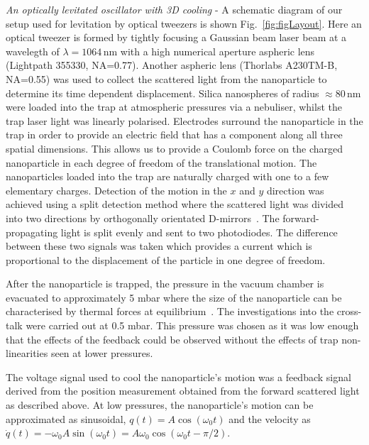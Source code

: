 \documentclass[aps,pra,twocolumn,nopacs,superscriptaddress,groupedaddress]{revtex4}
\begin{document}
\emph{An optically levitated oscillator with 3D cooling} - A schematic diagram of our setup used for levitation by optical tweezers is shown Fig.~\ref{fig:figLayout}.  Here an optical tweezer is formed by tightly focusing a Gaussian beam laser beam at a wavelegth of $\lambda=1064$\,nm with a high numerical aperture aspheric lens (Lightpath 355330, NA=0.77). Another aspheric lens (Thorlabs A230TM-B, NA=0.55) was used to collect the scattered light from the nanoparticle to determine its time dependent displacement. Silica nanospheres of radius $\approx80\,$nm were loaded into the trap at atmospheric pressures via a nebuliser, whilst the trap laser light was linearly polarised. Electrodes surround the nanoparticle in the trap in order to provide an electric field that has a component along all three spatial dimensions. This allows us to provide a Coulomb force on the charged nanoparticle in each degree of freedom of the translational motion. The nanoparticles loaded into the trap are naturally charged with one to a few elementary charges. Detection of the motion in the $x$ and $y$ direction was achieved using a split detection method where the scattered light was divided into two directions by orthogonally orientated D-mirrors~\cite{Li20213D}. The forward-propagating light is split evenly and sent to two photodiodes. The difference between these two signals was taken which provides a current which is proportional  to the displacement of the particle in one degree of freedom.  

After the nanoparticle is trapped, the pressure in the vacuum chamber is evacuated to approximately 5 mbar where the size of the nanoparticle can be characterised by thermal forces at equilibrium~\cite{Hebestreit2018Calibration}. The investigations into the cross-talk were carried out at 0.5 mbar. This pressure was chosen as it was low enough that the effects of the feedback could be observed without the effects of trap non-linearities seen at lower pressures.

The voltage signal used to cool the nanoparticle's motion was a feedback signal derived from the position measurement obtained from the forward scattered light as described above. At low pressures, the nanoparticle's motion can be approximated as sinusoidal, $q(t)=A \cos(\omega_0 t)$ and the velocity as $\Dot{q}(t)=-\omega_0 A \sin(\omega_0 t)=A\omega_0 \cos(\omega_0 t -\pi/2) $. 
\end{document}
